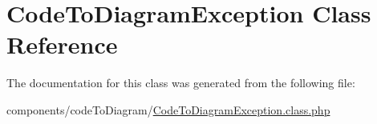 \hypertarget{class_code_to_diagram_exception}{
\section{CodeToDiagramException Class Reference}
\label{class_code_to_diagram_exception}
}


The documentation for this class was generated from the following file:\begin{CompactItemize}
\item 
components/codeToDiagram/\hyperlink{_code_to_diagram_exception_8class_8php}{CodeToDiagramException.class.php}\end{CompactItemize}
